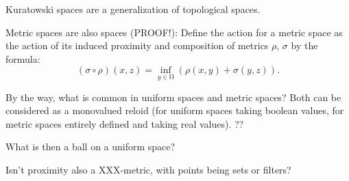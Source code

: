 Kuratowski spaces are a generalization of topological spaces.

Metric spaces are also spaces (PROOF!): Define the action for a metric space as the action of its induced proximity and composition of metrics $\rho$, $\sigma$ by the formula: \[ (\sigma\circ\rho)(x,z) = \inf_{y\in\mho}(\rho(x,y)+\sigma(y,z)). \]

By the way, what is common in uniform spaces and metric spaces? Both can be considered as a monovalued reloid (for uniform spaces taking boolean values, for metric spaces entirely defined and taking real values). ??

What is then a ball on a uniform space?

Isn't proximity also a XXX-metric, with points being sets or filters?
